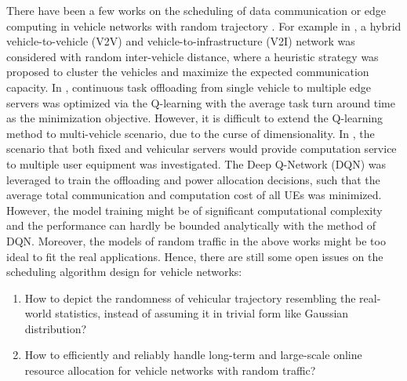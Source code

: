 There have been a few works on the scheduling of data communication or edge computing in vehicle networks with random trajectory
\cite{TVT18-Ni, Access19-Liu, TVT19-Liu, WC16-Salahuddin, TITS16-Wang, FGCS23-Sethi}.
For example in \cite{TVT18-Ni}, a hybrid vehicle-to-vehicle (V2V) and vehicle-to-infrastructure (V2I) network was considered with random inter-vehicle distance, where a heuristic strategy was proposed to cluster the vehicles and maximize the expected communication capacity.
In \cite{Access19-Liu}, continuous task offloading from single vehicle to multiple edge servers was optimized via the Q-learning with the average task turn around time as the minimization objective. However, it is difficult to extend the Q-learning method to multi-vehicle scenario, due to the curse of dimensionality.
In \cite{TVT19-Liu}, the scenario that both fixed and vehicular servers would provide computation service to multiple user equipment was investigated. The Deep Q-Network (DQN) was leveraged to train the offloading and power allocation decisions, such that the average total communication and computation cost of all UEs was minimized. However, the model training might be of significant computational complexity and the performance can hardly be bounded analytically with the method of DQN. Moreover, the models of random traffic in the above works might be too ideal to fit the real applications. Hence, there are still some open issues on the scheduling algorithm design for vehicle networks:
\begin{enumerate}
    \item How to depict the randomness of vehicular trajectory resembling the real-world statistics, instead of assuming it in trivial form like Gaussian distribution?
    \item How to efficiently and reliably handle long-term and large-scale online resource allocation for vehicle networks with random traffic?
\end{enumerate}

